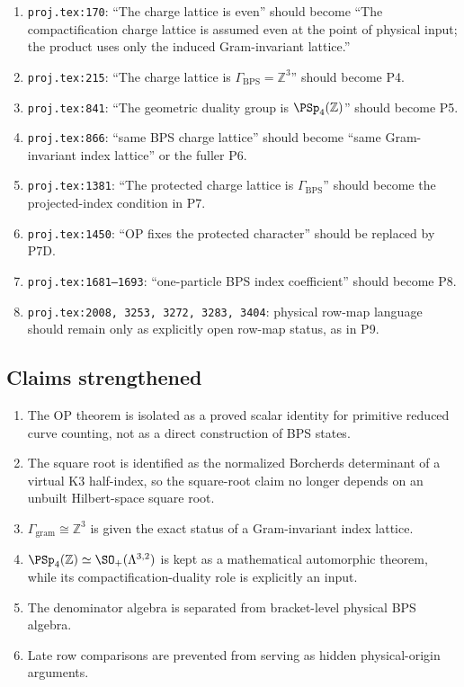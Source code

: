 \begin{enumerate}
\item \texttt{proj.tex:170}: ``The charge lattice is even'' should become
``The compactification charge lattice is assumed even at the point of
physical input; the product uses only the induced Gram-invariant lattice.''
\item \texttt{proj.tex:215}: ``The charge lattice is
\(\Gamma_{\mathrm{BPS}}=\mathbb Z^3\)'' should become P4.
\item \texttt{proj.tex:841}: ``The geometric duality group is
\(\PSp_4(\mathbb Z)\)'' should become P5.
\item \texttt{proj.tex:866}: ``same BPS charge lattice'' should become
``same Gram-invariant index lattice'' or the fuller P6.
\item \texttt{proj.tex:1381}: ``The protected charge lattice is
\(\Gamma_{\mathrm{BPS}}\)'' should become the projected-index condition in
P7.
\item \texttt{proj.tex:1450}: ``OP fixes the protected character'' should
be replaced by P7D.
\item \texttt{proj.tex:1681--1693}: ``one-particle BPS index
coefficient'' should become P8.
\item \texttt{proj.tex:2008, 3253, 3272, 3283, 3404}: physical row-map
language should remain only as explicitly open row-map status, as in P9.
\end{enumerate}

\subsection{Claims strengthened}

\begin{enumerate}
\item The OP theorem is isolated as a proved scalar identity for primitive
reduced curve counting, not as a direct construction of BPS states.
\item The square root is identified as the normalized Borcherds
determinant of a virtual K3 half-index, so the square-root claim no longer
depends on an unbuilt Hilbert-space square root.
\item \(\Gamma_{\mathrm{gram}}\cong\mathbb Z^3\) is given the exact status
of a Gram-invariant index lattice.
\item \(\PSp_4(\mathbb Z)\simeq\SO_+(\Lambda^{3,2})\) is kept as a
mathematical automorphic theorem, while its compactification-duality role
is explicitly an input.
\item The denominator algebra is separated from bracket-level physical
BPS algebra.
\item Late row comparisons are prevented from serving as hidden
physical-origin arguments.
\end{enumerate}

